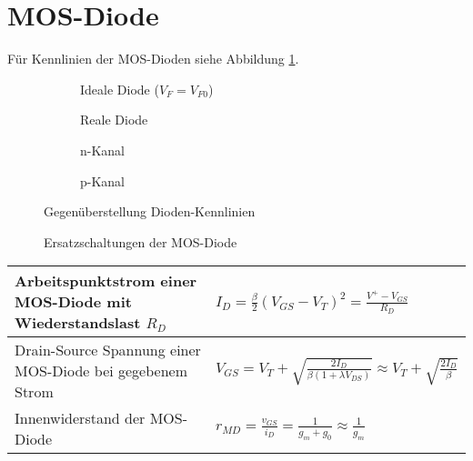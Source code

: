 \section{MOS-Diode}
Für Kennlinien der MOS-Dioden siehe Abbildung \ref{fig:diodenKennlinien}.
\begin{figure}[h]
	\centering
	\begin{subfigure}[b]{5cm}
		\centering
		{}
		\caption{Ideale Diode ($V_F = V_{F0}$)}
	\end{subfigure}
	\begin{subfigure}[b]{4cm}
		\centering
		{}
		\caption{Reale Diode}
	\end{subfigure} \quad
	\begin{subfigure}[b]{4cm}
		\centering
		{}
		\caption{n-Kanal}
	\end{subfigure}
	\begin{subfigure}[b]{4cm}
		\centering
		{}
		\caption{p-Kanal}
	\end{subfigure}
	\hspace{1.5cm}
	
	\begin{subfigure}[b]{4cm}
		{}
	\end{subfigure} \quad
	\begin{subfigure}[b]{4cm}
		\centering
		{}
	\end{subfigure} \qquad
	\begin{subfigure}[b]{8cm}
		\centering
		{}
	\end{subfigure}			
	\caption{Gegenüberstellung Dioden-Kennlinien}
	\label{fig:diodenKennlinien}
\end{figure}

\begin{figure}[h]
	\centering
	\begin{subfigure}[b]{5cm}
		\centering
		{}
	\end{subfigure} \qquad\qquad
	\begin{subfigure}[b]{3cm}
		\centering
		{}
	\end{subfigure}
	\caption{Ersatzschaltungen der MOS-Diode}
\end{figure}

\begin{tabular}{|l|l|}
	\hline
	Arbeitspunktstrom einer MOS-Diode mit Wiederstandslast $R_D$
	& $I_D = \frac{\beta}{2} (V_{GS} -V_T)^2 = \frac{V^+ - V_{GS}}{R_D} $
	\\ \hline
	Drain-Source Spannung einer MOS-Diode bei gegebenem Strom
	& $ V_{GS} = V_T + \sqrt{\frac{2I_D}{\beta(1+\lambda V_{DS})}} \approx V_T + \sqrt{\frac{2I_D}{\beta}} $
	\\ \hline
	Innenwiderstand der MOS-Diode
	& $ r_{MD} = \frac{v_{GS}}{i_D} = \frac{1}{g_m + g_0} \approx \frac{1}{g_m} $
	\\ \hline	
\end{tabular}

